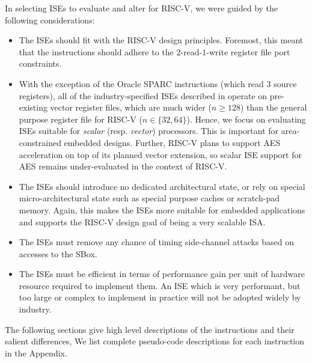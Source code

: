 
In selecting ISEs to evaluate and alter for RISC-V, we were guided by the
following considerations:

\begin{itemize}
\item The ISEs should fit with the RISC-V design principles.
      Foremost, this meant that the instructions should adhere to
      the $2$-read-$1$-write register file port constraints.
\item With the exception of the Oracle SPARC
      instructions (which read $3$ source registers),
      all of the industry-specified ISEs described in
       operate on pre-existing vector
      register files, which are much wider ($n\ge128$) than the
      general purpose register file for RISC-V ($n\in\{32,64\}$).
      Hence, we focus on evaluating ISEs suitable for {\em scalar}
      (resp. {\em vector}) processors.
      This is important for area-constrained embedded designs.
      Further, RISC-V plans to support AES acceleration on top of
      its planned vector extension, so scalar ISE support for
      AES remains under-evaluated in the context of RISC-V.
\item The ISEs should introduce no dedicated architectural state, or
      rely on special micro-architectural state such as special
      purpose caches or scratch-pad memory.
      Again, this makes the ISEs more suitable for embedded
      applications and supports the RISC-V design goal of being
      a very scalable ISA.
\item The ISEs must remove any chance of timing side-channel attacks
      based on accesses to the SBox.
\item The ISEs must be efficient in terms of performance gain per
      unit of hardware resource required to implement them.
      An ISE which is very performant, but too large or complex to implement
      in practice will not be adopted widely by industry.
\end{itemize}

The following sections give high level descriptions of the
instructions and their salient differences,
We list complete pseudo-code descriptions for each instruction
in the Appendix.

